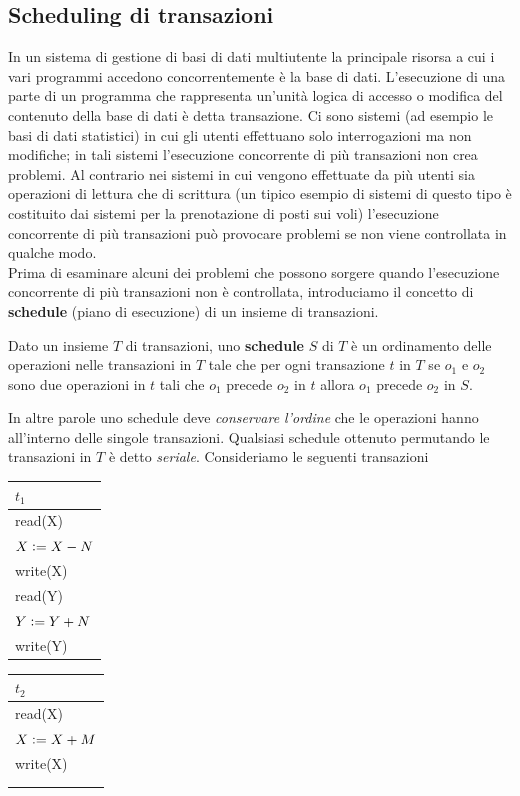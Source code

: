 \subsection{Scheduling di transazioni}
In un sistema di gestione di basi di dati multiutente la principale risorsa a cui i vari programmi
accedono concorrentemente è la base di dati. L'esecuzione di una parte di un programma che
rappresenta un'unità logica di accesso o modifica del contenuto della base di dati è detta
transazione. Ci sono sistemi (ad esempio le basi di dati statistici) in cui gli utenti effettuano solo
interrogazioni ma non modifiche; in tali sistemi l'esecuzione concorrente di più transazioni non crea
problemi. Al contrario nei sistemi in cui vengono effettuate da più utenti sia operazioni di lettura
che di scrittura (un tipico esempio di sistemi di questo tipo è costituito dai sistemi per la
prenotazione di posti sui voli) l'esecuzione concorrente di più transazioni può provocare problemi
se non viene controllata in qualche modo.\\
Prima di esaminare alcuni dei problemi che possono sorgere quando l'esecuzione concorrente di più
transazioni non è controllata, introduciamo il concetto di \textbf{schedule} (piano di esecuzione) di un
insieme di transazioni.
\begin{defn}
Dato un insieme $T$ di transazioni, uno \textbf{schedule} $S$ di $T$ è un ordinamento delle
operazioni nelle transazioni in $T$ tale che per ogni transazione $t$ in $T$ se $o_1$ e $o_2$ sono due operazioni
in $t$ tali che $o_1$ precede $o_2$ in $t$ allora $o_1$ precede $o_2$ in $S$.
\end{defn}
In altre parole uno schedule deve \emph{conservare l'ordine} che le operazioni hanno all'interno delle singole 
transazioni. Qualsiasi schedule ottenuto permutando le transazioni in $T$ è detto \emph{seriale}.
Consideriamo le seguenti transazioni

\begin{multicols}{2}  
 \begin{tabular}{|l|}
   \hline
   $t_1$\\
   \hline
   read(X)\\ 
   $X\vcentcolon=X-N$\\ 
   write(X)\\ 
   read(Y)\\
   $Y\vcentcolon=Y+N$\\
   write(Y)\\
   \hline
  \end{tabular} 
  
 \begin{tabular}{|l|}
  \hline
   $t_2$\\
   \hline
   read(X)\\ 
   $X\vcentcolon=X+M$\\ 
   write(X)\\
   \\
   \\
   \hline
  \end{tabular}\\
 \end{multicols}
 
